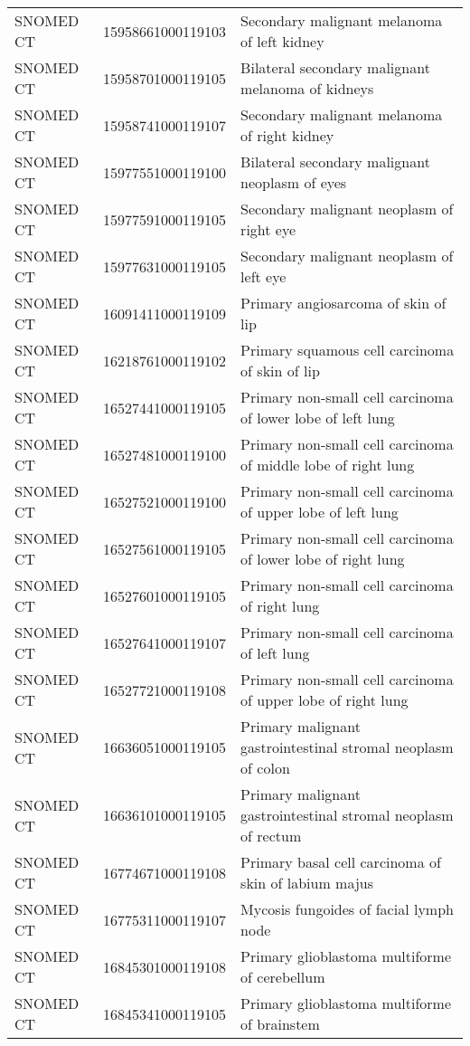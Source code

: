 \begin{longtable}{p{}p{}p{}}
  SNOMED CT & 15958661000119103 & Secondary malignant melanoma of left kidney \\ 
  SNOMED CT & 15958701000119105 & Bilateral secondary malignant melanoma of kidneys \\ 
  SNOMED CT & 15958741000119107 & Secondary malignant melanoma of right kidney \\ 
  SNOMED CT & 15977551000119100 & Bilateral secondary malignant neoplasm of eyes \\ 
  SNOMED CT & 15977591000119105 & Secondary malignant neoplasm of right eye \\ 
  SNOMED CT & 15977631000119105 & Secondary malignant neoplasm of left eye \\ 
  SNOMED CT & 16091411000119109 & Primary angiosarcoma of skin of lip \\ 
  SNOMED CT & 16218761000119102 & Primary squamous cell carcinoma of skin of lip \\ 
  SNOMED CT & 16527441000119105 & Primary non-small cell carcinoma of lower lobe of left lung \\ 
  SNOMED CT & 16527481000119100 & Primary non-small cell carcinoma of middle lobe of right lung \\ 
  SNOMED CT & 16527521000119100 & Primary non-small cell carcinoma of upper lobe of left lung \\ 
  SNOMED CT & 16527561000119105 & Primary non-small cell carcinoma of lower lobe of right lung \\ 
  SNOMED CT & 16527601000119105 & Primary non-small cell carcinoma of right lung \\ 
  SNOMED CT & 16527641000119107 & Primary non-small cell carcinoma of left lung \\ 
  SNOMED CT & 16527721000119108 & Primary non-small cell carcinoma of upper lobe of right lung \\ 
  SNOMED CT & 16636051000119105 & Primary malignant gastrointestinal stromal neoplasm of colon \\ 
  SNOMED CT & 16636101000119105 & Primary malignant gastrointestinal stromal neoplasm of rectum \\ 
  SNOMED CT & 16774671000119108 & Primary basal cell carcinoma of skin of labium majus \\ 
  SNOMED CT & 16775311000119107 & Mycosis fungoides of facial lymph node \\ 
  SNOMED CT & 16845301000119108 & Primary glioblastoma multiforme of cerebellum \\ 
  SNOMED CT & 16845341000119105 & Primary glioblastoma multiforme of brainstem \\ 

\end{longtable}
